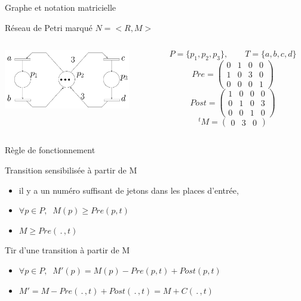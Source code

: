 \documentclass[compress]{beamer}
\begin{document}
\begin{frame}{Graphe et notation matricielle}
\begin{block}{Réseau de Petri marqué $N=<\!R,M\!>$}
\begin{columns}
	\begin{column}{.5\textwidth}
		\includegraphics[width=5.5cm]{lececr}
	\end{column}
	\begin{column}{.6\textwidth}
		$$P=\{p_1,p_2,p_3\}, \qquad T=\{a,b,c,d\}$$
		$$Pre = \begin{pmatrix}
			0 & 1 & 0 & 0 \\
			1 & 0 & 3 & 0 \\
			0 & 0 & 0 & 1 
			\end{pmatrix}$$
		$$Post = \begin{pmatrix}
			1 & 0 & 0 & 0 \\
			0 & 1 & 0 & 3 \\
			0 & 0 & 1 & 0 
			\end{pmatrix}$$
		$${}^tM = \begin{pmatrix}0 & 3 & 0\end{pmatrix}$$
	\end{column}	
\end{columns}
\end{block}
\end{frame}

\begin{frame}{Règle de fonctionnement}
\begin{block}{Transition sensibilisée à partir de M}
	\begin{itemize}
	\item il y a un numéro suffisant de jetons dans les places d'entrée,
	\item $\forall p \in P, \;\;  M(p) \geq Pre(p, t)$
	\item $M \geq Pre(\, . \, ,t)$
	\end{itemize}
\end{block}
\begin{block}{Tir d'une transition à partir de M}
	\begin{itemize}
	\item $\forall p \in P, \;\; M'(p)=M(p)-Pre(p,t)+Post(p,t)$
	\item $M'=M-Pre(\, . \, ,t)+Post(\, . \, ,t)=M + C(\, . \, ,t)$
	\end{itemize}
\end{block}
\end{frame}
\end{document}
